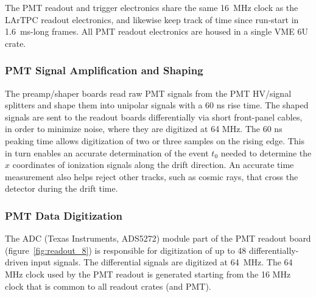 The PMT readout and trigger electronics share the same 16~MHz clock as the LArTPC readout electronics, and likewise keep track of time since run-start in 1.6~ms-long frames. All PMT readout electronics are housed in a single VME 6U crate.

\subsubsection{\label{sec:PMTamp}PMT Signal Amplification and Shaping}

The preamp/shaper boards read raw PMT signals from the PMT HV/signal splitters and shape them into unipolar signals with a 60 ns rise time. The shaped signals are sent to the \lartpc readout boards differentially via short front-panel cables, in order to minimize noise, where they are digitized at 64 MHz. The 60 ns peaking time allows digitization of two or three samples on the rising edge. This in turn enables an accurate determination of the event $t_0$ needed to determine the $x$ coordinates of ionization signals along the drift direction. An accurate time measurement also helps reject other tracks, such as cosmic rays, that cross the detector during the drift time.

\subsubsection{PMT Data Digitization}
\label{sec:pmtdigit}

The ADC (Texas Instruments, ADS5272) module part of the PMT readout board (figure~\ref{fig:readout_8}) is responsible for digitization of up to 48 differentially-driven input signals. The differential signals are digitized at 64~MHz. The 64 MHz clock used by the PMT readout is generated starting from the 16 MHz clock that is common to all readout crates (\lartpc and PMT). 


